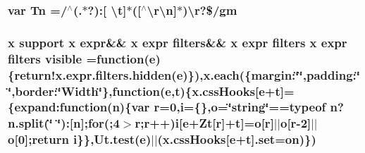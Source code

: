 \hypertarget{_bibabook_2_scripts_2jquery-1_810_82_8min_8js_a2a743fa90b7bc233019c5b720ccde5cc}{}
\subsubsection[{Tn}]{\setlength{\rightskip}{0pt plus 5cm}var Tn =/$^\wedge$(.$\ast$?)\+:\mbox{[} \textbackslash{}{\bf t}\mbox{]}$\ast$(\mbox{[}$^\wedge$\textbackslash{}r\textbackslash{}n\mbox{]}$\ast$)\textbackslash{}r?\$/gm}\label{_bibabook_2_scripts_2jquery-1_810_82_8min_8js_a2a743fa90b7bc233019c5b720ccde5cc}
\hypertarget{_bibabook_2_scripts_2jquery-1_810_82_8min_8js_a52992524aa1f4d01d5c9f1b9a15c35f5}{}
\subsubsection[{visible}]{ {\bf x} {\bf support} {\bf x} {\bf expr}\&\& {\bf x} {\bf expr} filters\&\& {\bf x} {\bf expr} filters {\bf x} {\bf expr} filters visible =function({\bf e})\{{\bf return!x.\+expr.\+filters.\+hidden}({\bf e})\}),{\bf x.\+each}(\{margin\+:\char`\"{}\char`\"{},padding\+:\char`\"{}\char`\"{},border\+:\char`\"{}Width\char`\"{}\},function({\bf e},{\bf t})\{{\bf x.\+css\+Hooks}\mbox{[}{\bf e}+{\bf t}\mbox{]}=\{expand\+:function(n)\{var r=0,{\bf i}=\{\},{\bf o}=\char`\"{}string\char`\"{}==typeof n?n.\+split(\char`\"{} \char`\"{})\+:\mbox{[}n\mbox{]};for(;4$>$r;r++){\bf i}\mbox{[}{\bf e}+Zt\mbox{[}r\mbox{]}+{\bf t}\mbox{]}={\bf o}\mbox{[}r\mbox{]}$\vert$$\vert${\bf o}\mbox{[}r-\/2\mbox{]}$\vert$$\vert${\bf o}\mbox{[}0\mbox{]};return {\bf i}\}\},Ut.\+test({\bf e})$\vert$$\vert$({\bf x.\+css\+Hooks}\mbox{[}{\bf e}+{\bf t}\mbox{]}.set={\bf on})\})}\label{_bibabook_2_scripts_2jquery-1_810_82_8min_8js_a52992524aa1f4d01d5c9f1b9a15c35f5}
\hypertarget{_bibabook_2_scripts_2jquery-1_810_82_8min_8js_a4d3ea42bab8c1a36105c29b5a098a050}{}
